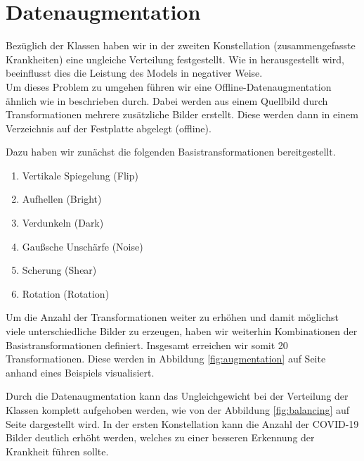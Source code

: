 \section{Datenaugmentation}

Bezüglich der Klassen haben wir in der zweiten Konstellation (zusammengefasste Krankheiten) eine ungleiche Verteilung festgestellt. Wie in \cite{BUDA2018249} herausgestellt wird, beeinflusst dies die Leistung des Models in negativer Weise.\\
Um dieses Problem zu umgehen führen wir eine Offline-Datenaugmentation ähnlich wie in \cite{UCAR2020109761} beschrieben durch. Dabei werden aus einem Quellbild durch Transformationen mehrere zusätzliche Bilder erstellt. Diese werden dann in einem Verzeichnis auf der Festplatte abgelegt (offline).

Dazu haben wir zunächst die folgenden Basistransformationen bereitgestellt.
\begin{enumerate}
	\item{Vertikale Spiegelung (Flip)}
	\item{Aufhellen (Bright)}
	\item{Verdunkeln (Dark)}
	\item{Gaußsche Unschärfe (Noise)}
	\item{Scherung (Shear)}
	\item{Rotation (Rotation)}
\end{enumerate}
Um die Anzahl der Transformationen weiter zu erhöhen und damit möglichst viele unterschiedliche Bilder zu erzeugen, haben wir weiterhin Kombinationen der Basistransformationen definiert.
Insgesamt erreichen wir somit 20 Transformationen. Diese werden in Abbildung \ref{fig:augmentation} auf Seite \pageref{fig:augmentation} anhand eines Beispiels visualisiert.

Durch die Datenaugmentation kann das Ungleichgewicht bei der Verteilung der Klassen komplett aufgehoben werden, wie von der Abbildung \ref{fig:balancing} auf Seite \pageref{fig:balancing} dargestellt wird.
In der ersten Konstellation kann die Anzahl der COVID-19 Bilder deutlich erhöht werden, welches zu einer besseren Erkennung der Krankheit führen sollte.

